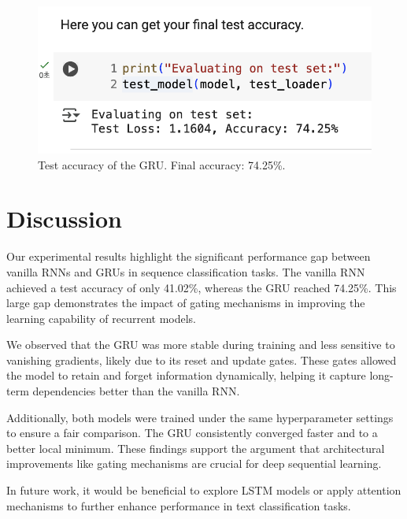 \begin{figure}[h]
\centering
\includegraphics[width=0.8\linewidth]{GRU_accuracy.png}
\caption{Test accuracy of the GRU. Final accuracy: 74.25\%.}
\end{figure}

\section{Discussion}
\label{sec:discussion}

Our experimental results highlight the significant performance gap between vanilla RNNs and GRUs in sequence classification tasks. The vanilla RNN achieved a test accuracy of only 41.02\%, whereas the GRU reached 74.25\%. This large gap demonstrates the impact of gating mechanisms in improving the learning capability of recurrent models.

We observed that the GRU was more stable during training and less sensitive to vanishing gradients, likely due to its reset and update gates. These gates allowed the model to retain and forget information dynamically, helping it capture long-term dependencies better than the vanilla RNN.

Additionally, both models were trained under the same hyperparameter settings to ensure a fair comparison. The GRU consistently converged faster and to a better local minimum. These findings support the argument that architectural improvements like gating mechanisms are crucial for deep sequential learning.

In future work, it would be beneficial to explore LSTM models or apply attention mechanisms to further enhance performance in text classification tasks.

